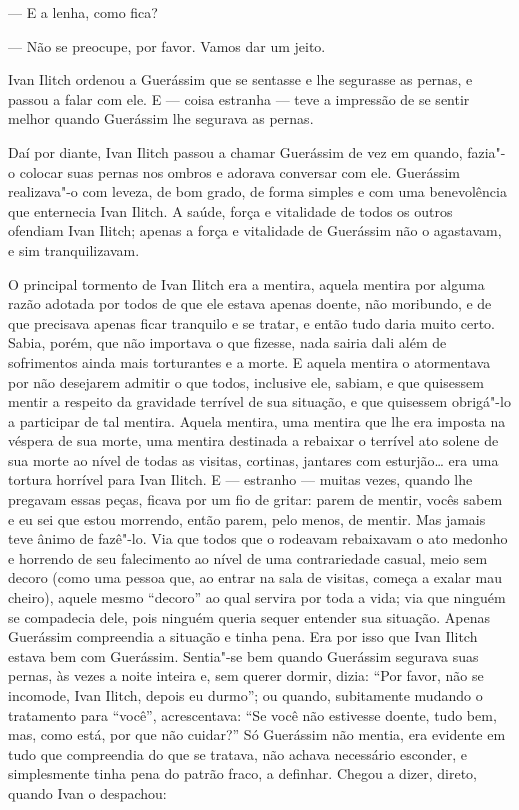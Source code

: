 --- E a lenha, como fica?

--- Não se preocupe, por favor. Vamos dar um jeito.

Ivan Ilitch ordenou a Guerássim que se sentasse e lhe segurasse as
pernas, e passou a falar com ele. E --- coisa estranha --- teve a
impressão de se sentir melhor quando Guerássim lhe segurava as pernas.

Daí por diante, Ivan Ilitch passou a chamar Guerássim de vez em quando,
fazia"-o colocar suas pernas nos ombros e adorava conversar com ele.
Guerássim realizava"-o com leveza, de bom grado, de forma simples e com
uma benevolência que enternecia Ivan Ilitch. A saúde, força e vitalidade
de todos os outros ofendiam Ivan Ilitch; apenas a força e vitalidade de
Guerássim não o agastavam, e sim tranquilizavam.

O principal tormento de Ivan Ilitch era a mentira, aquela mentira por
alguma razão adotada por todos de que ele estava apenas doente, não
moribundo, e de que precisava apenas ficar tranquilo e se tratar, e
então tudo daria muito certo. Sabia, porém, que não importava o que
fizesse, nada sairia dali além de sofrimentos ainda mais torturantes e a
morte. E aquela mentira o atormentava por não desejarem admitir o que
todos, inclusive ele, sabiam, e que quisessem mentir a respeito da
gravidade terrível de sua situação, e que quisessem obrigá"-lo a
participar de tal mentira. Aquela mentira, uma mentira que lhe era
imposta na véspera de sua morte, uma mentira destinada a rebaixar o
terrível ato solene de sua morte ao nível de todas as visitas, cortinas,
jantares com esturjão\ldots{} era uma tortura horrível para Ivan Ilitch. E ---
estranho --- muitas vezes, quando lhe pregavam essas peças, ficava por um
fio de gritar: parem de mentir, vocês sabem e eu sei que estou morrendo,
então parem, pelo menos, de mentir. Mas jamais teve ânimo de fazê"-lo.
Via que todos que o rodeavam rebaixavam o ato medonho e horrendo de seu
falecimento ao nível de uma contrariedade casual, meio sem decoro (como
uma pessoa que, ao entrar na sala de visitas, começa a exalar mau
cheiro), aquele mesmo ``decoro'' ao qual servira por toda a vida; via
que ninguém se compadecia dele, pois ninguém queria sequer entender sua
situação. Apenas Guerássim compreendia a situação e tinha pena. Era por
isso que Ivan Ilitch estava bem com Guerássim. Sentia"-se bem quando
Guerássim segurava suas pernas, às vezes a noite inteira e, sem querer
dormir, dizia: ``Por favor, não se incomode, Ivan Ilitch, depois eu
durmo''; ou quando, subitamente mudando o tratamento para ``você'',
acrescentava: ``Se você não estivesse doente, tudo bem, mas, como está,
por que não cuidar?'' Só Guerássim não mentia, era evidente em tudo que
compreendia do que se tratava, não achava necessário esconder, e
simplesmente tinha pena do patrão fraco, a definhar. Chegou a dizer,
direto, quando Ivan o despachou:

